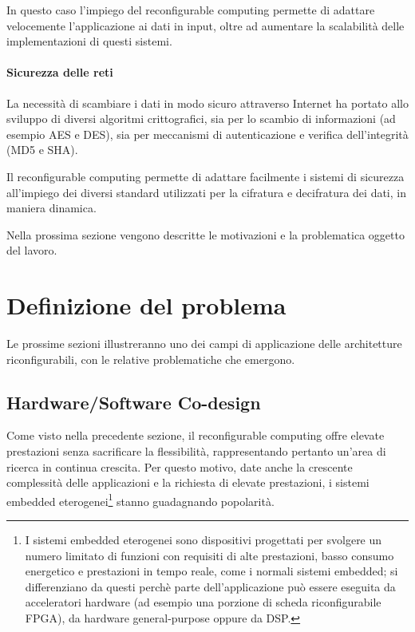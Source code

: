 In questo caso l'impiego del reconfigurable computing permette di adattare velocemente
l'applicazione ai dati in input, oltre ad aumentare la scalabilità delle implementazioni
di questi sistemi.


\paragraph{Sicurezza delle reti}
La necessità di scambiare i dati in modo sicuro attraverso Internet ha portato allo sviluppo
di diversi algoritmi crittografici, sia per lo scambio di informazioni (ad esempio
\ac{AES} e \ac{DES}), sia per meccanismi di autenticazione e verifica dell'integrità
(MD5 e \ac{SHA}).

Il reconfigurable computing permette di adattare facilmente i sistemi di sicurezza
all'impiego dei diversi standard utilizzati per la cifratura e decifratura dei dati, in
maniera dinamica.

Nella prossima sezione vengono descritte le motivazioni e la problematica oggetto del
lavoro.

\section{Definizione del problema}
\label{sec:definizioneProblema}
Le prossime sezioni illustreranno uno dei campi di applicazione delle architetture
riconfigurabili, con le relative problematiche che emergono.

\subsection{Hardware/Software Co-design}
Come visto nella precedente sezione, il reconfigurable computing offre elevate
prestazioni senza sacrificare la flessibilità, rappresentando pertanto un'area di
ricerca in continua crescita. Per questo motivo, date anche la crescente complessità
delle applicazioni e la richiesta di elevate prestazioni, i sistemi embedded
eterogenei\footnote{I sistemi embedded eterogenei sono dispositivi progettati per
svolgere un numero limitato di funzioni con requisiti di alte prestazioni, basso consumo
energetico e prestazioni in tempo reale, come i normali sistemi embedded; si
differenziano da questi perchè parte dell'applicazione può essere eseguita da
acceleratori hardware (ad esempio una porzione di scheda riconfigurabile FPGA), da
hardware general-purpose oppure da \ac{DSP}.} stanno guadagnando popolarità.

